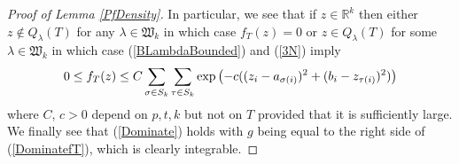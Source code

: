\begin{proof}[Proof of Lemma \ref{PfDensity}]
In particular, we see that if $z\in\mathbb{R}^{k}$ then either $z\not\in Q_{\lambda}(T)$ for any $\lambda\in\mathfrak{W}_{k}$ in which case $f_{T}(z)=0$ or $z\in Q_{\lambda}(T)$ for some $\lambda\in\mathfrak{W}_k$ in which case (\ref{BLambdaBounded}) and (\ref{3N}) imply
\begin{equation}{\label{DominatefT}}
	\begin{split}
		0\leq f_T(z)\leq C\sum_{\sigma\in S_{k}}\sum_{\tau\in S_{k}}\exp\left(-c((z_i-a_{\sigma(i)})^2+(b_i-z_{\tau(i)})^2)\right)
	\end{split}
\end{equation}
where $C$, $c>0$ depend on $p,t,k$ but not on $T$ provided that it is sufficiently large. We finally see that (\ref{Dominate}) holds with $g$ being equal to the right side of (\ref{DominatefT}), which is clearly integrable.
\end{proof}


